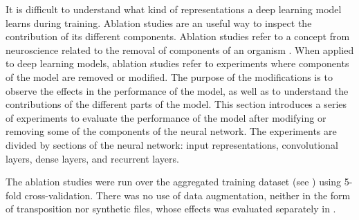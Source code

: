 
It is difficult to understand what kind of representations a
deep learning model learns during training. Ablation studies
are an useful way to inspect the contribution of its
different components. Ablation studies refer to a concept
from neuroscience related to the removal of components of an
organism \parencite{meyes2019ablation}. When applied to deep
learning models, ablation studies refer to experiments where
components of the model are removed or modified. The purpose
of the modifications is to observe the effects in the
performance of the model, as well as to understand the
contributions of the different parts of the model. This
section introduces a series of experiments to evaluate the
performance of the model after modifying or removing some of
the components of the neural network. The experiments are
divided by sections of the neural network: input
representations, convolutional layers, dense layers, and
recurrent layers.

The ablation studies were run over the aggregated training
dataset (see ) using 5-fold
cross-validation. There was no use of data augmentation,
neither in the form of transposition nor synthetic files,
whose effects was evaluated separately in
.
